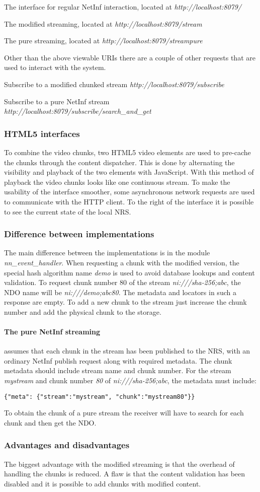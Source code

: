 The interface for regular NetInf interaction, located at 
\textit{http://localhost:8079/}

The modified streaming, located at
\textit{http://localhost:8079/stream}

The pure streaming, located at
\textit{http://localhost:8079/streampure}

Other than the above viewable URIs there are a couple of other requests that are used to interact with the system. 

Subscribe to a modified chunked stream
\textit{http://localhost:8079/subscribe}

Subscribe to a pure NetInf stream
\textit{http://localhost:8079/subscribe/search\_and\_get}


\subsubsection{HTML5 interfaces}
To combine the video chunks, two HTML5 video elements are used to pre-cache the chunks through the content dispatcher. This is done by alternating the visibility and playback of the two elements with JavaScript. With this method of playback the video chunks looks like one continuous stream. 
To make the usability of the interface smoother, some asynchronous network requests are used to communicate with the HTTP client.
To the right of the interface it is possible to see the current state of the local NRS. 

\subsubsection{Difference between implementations}
The main difference between the implementations is in the module \textit{nn\_event\_handler}. When requesting a chunk with the modified version, the special hash algorithm name \textit{demo} is used to avoid database lookups and content validation. To request chunk number 80 of the stream \textit{ni:///sha-256;abc}, the NDO name will be \textit{ni:///demo;abc80}. The metadata and locators in such a response are empty. To add a new chunk to the stream just increase the chunk number and add the physical chunk to the storage. 
\paragraph{The pure NetInf streaming} assumes that each chunk in the stream has been published to the NRS, with an ordinary NetInf publish request along with required metadata. The chunk metadata should include stream name and chunk number. For the stream \textit{mystream} and chunk number \textit{80} of \textit{ni:///sha-256;abc}, the metadata must include:
\begin{verbatim}
{"meta": {"stream":"mystream", "chunk":"mystream80"}}
\end{verbatim}
To obtain the chunk of a pure stream the receiver will have to search for each chunk and then get the NDO.

\subsubsection{Advantages and disadvantages}
The biggest advantage with the modified streaming is that the overhead of handling the chunks is reduced. A flaw is that the content validation has been disabled and it is possible to add chunks with modified content. 